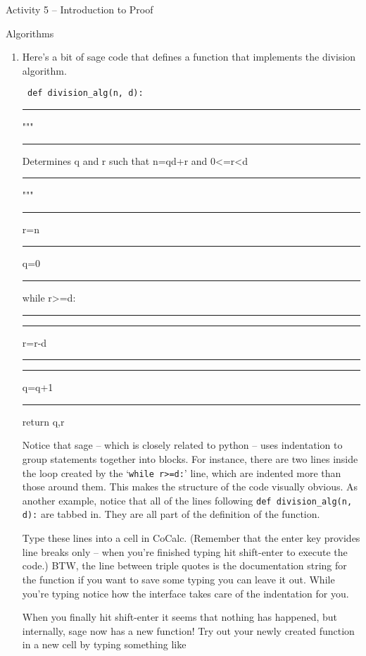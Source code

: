 \documentclass{amsart}
\begin{document}
\thispagestyle{empty}

\centerline{\Large Activity 5 -- Introduction to Proof}
\centerline{\large Algorithms}

\bigskip
\Large


\begin{enumerate}
\item Here's a bit of sage code that defines a function that implements the division algorithm.

\vspace{.2in}

\begin{minipage}[b]{.9\textwidth}
\tt 
def division\_alg(n, d):\\
\rule{4ex}{0pt}    """\\
\rule{4ex}{0pt}    Determines q and r such that n=qd+r and 0<=r<d\\
\rule{4ex}{0pt}    """\\
\rule{4ex}{0pt}    r=n\\
\rule{4ex}{0pt}    q=0\\
\rule{4ex}{0pt}   while r>=d:\\
\rule{4ex}{0pt} \rule{4ex}{0pt}        r=r-d\\
\rule{4ex}{0pt} \rule{4ex}{0pt}        q=q+1\\
\rule{4ex}{0pt}    return q,r\\
\end{minipage}

\vspace{.2in}

Notice that sage -- which is closely related to python -- uses indentation to group statements together into blocks.  For instance, there are two lines inside the loop created by the `{\tt while r>=d:}' line, which are indented more than those around them.  This makes the structure of the code visually obvious.  As another example, notice that all of the lines following {\tt def division\_alg(n, d):} are tabbed in. They are all part of the definition of the function.  

Type these lines into a cell in CoCalc.  (Remember that the enter key provides line breaks only -- when you're finished typing hit shift-enter to execute the code.)  BTW, the line between triple quotes is the documentation string for the function if you want to save some typing you can leave it out.  While you're typing notice how the interface takes care of the indentation for you.

When you finally hit shift-enter it seems that nothing has happened, but internally, sage now has a new function!  Try out your newly created function in a new cell by typing something like


\end{enumerate}
\end{document}
